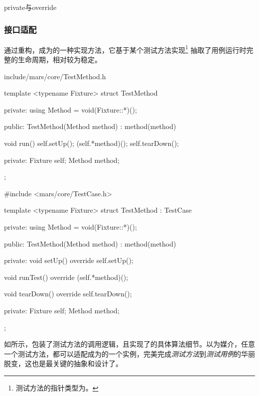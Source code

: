 \begin{content}
\begin{episode}{private与override}
\begin{content}
\end{content}
\end{episode}

\subsubsection{接口适配}

通过重构，成为的一种实现方法，它基于某个测试方法实现\footnote{测试方法的指针类型为。} 抽取了用例运行时完整的生命周期，相对较为稳定。

\begin{diff}{include/mars/core/TestMethod.h}
 \begin{minicpp}
template <typename Fixture>
struct TestMethod {
private:
  using Method = void(Fixture::*)();

public:
  TestMethod(Method method)
    : method(method) {}

  void run() {
    self.setUp();
    (self.*method)();
    self.tearDown();
  }

private:
  Fixture self;
  Method method;
};
  \end{minicpp}
\tcblower
 \begin{minicpp}
#include <mars/core/TestCase.h>

template <typename Fixture>
struct TestMethod : TestCase {
private:
  using Method = void(Fixture::*)();

public:
  TestMethod(Method method)
    : method(method) {}

private:
  void setUp() override {
    self.setUp();
  }

  void runTest() override {
    (self.*method)();
  }

  void tearDown() override {
    self.tearDown();
  }

private:
  Fixture self;
  Method method;
};
  \end{minicpp}
\end{diff}

如所示，包装了测试方法的调用逻辑，且实现了的具体算法细节。以为媒介，任意一个测试方法，都可以适配成为的一个实例，完美完成\emph{测试方法}到\emph{测试用例}的华丽脱变，这也是最关键的抽象和设计了。


\end{content}
